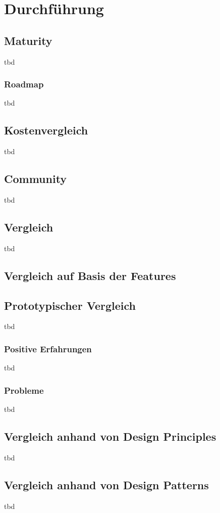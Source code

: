 \section{Durchführung}

\subsection{Maturity}
tbd

\subsubsection{Roadmap}
tbd

\subsection{Kostenvergleich}
tbd

\subsection{Community}
tbd

\subsection{Vergleich}
tbd

\subsection{Vergleich auf Basis der Features}


\subsection{Prototypischer Vergleich}
tbd

\subsubsection{Positive Erfahrungen}
tbd

\subsubsection{Probleme}
tbd

\subsection{Vergleich anhand von Design Principles}
tbd

\subsection{Vergleich anhand von Design Patterns}
tbd
